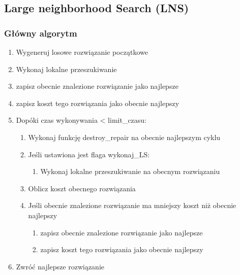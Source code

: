 \documentclass[11pt]{article}
\begin{document}
\subsection{Large neighborhood Search (LNS)}\label{subsec:lns}


\subsubsection{Główny algorytm}
\begin{enumerate}
    \item Wygeneruj losowe rozwiązanie początkowe
    \item Wykonaj lokalne przeszukiwanie
    \item zapisz obecnie znalezione rozwiązanie jako najlepsze
    \item zapisz koszt tego rozwiązania jako obecnie najlepszy
    \item Dopóki czas wykonywania < limit\_czasu:
        \begin{enumerate}
            \item Wykonaj funkcję destroy\_repair na obecnie najlepszym cyklu
            \item Jeśli ustawiona jest flaga wykonaj\_LS:
            \begin{enumerate}
                \item Wykonaj lokalne przeszukiwanie na obecnym rozwiązaniu
            \end{enumerate}
            \item Oblicz koszt obecnego rozwiązania
            \item Jeśli obecnie znalezione rozwiązanie ma mniejszy koszt niż obecnie najlepszy
                \begin{enumerate}
                    \item zapisz obecnie znalezione rozwiązanie jako najlepsze
                    \item zapisz koszt tego rozwiązania jako obecnie najlepszy
                \end{enumerate}
        \end{enumerate}
    \item Zwróć najlepsze rozwiązanie
\end{enumerate}
\end{document}
